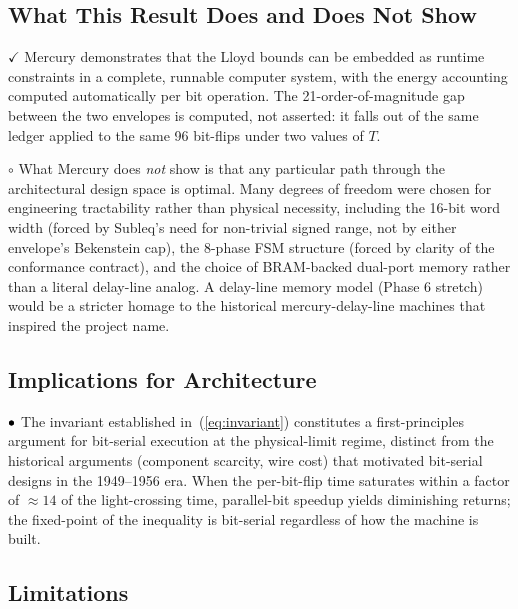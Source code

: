 \documentclass[conference,letterpaper,10pt]{IEEEtran}
\newcommand{\Verified}{\textbf{\textcolor[rgb]{0.0,0.5,0.0}{$\checkmark$}}}
\newcommand{\Plausible}{\textbf{\textcolor[rgb]{0.6,0.4,0.0}{$\bullet\hspace{-0.5em}\circ$}}}
\newcommand{\Speculative}{\textbf{\textcolor[rgb]{0.7,0.0,0.0}{$\circ$}}}
\begin{document}
\subsection{What This Result Does and Does Not Show}

\Verified{} Mercury demonstrates that the Lloyd bounds can be
embedded as runtime constraints in a complete, runnable computer
system, with the energy accounting computed automatically per
bit operation. The 21-order-of-magnitude gap between the two
envelopes is computed, not asserted: it falls out of the same
ledger applied to the same 96 bit-flips under two values of $T$.

\Speculative{} What Mercury does \emph{not} show is that any
particular path through the architectural design space is
optimal. Many degrees of freedom were chosen for engineering
tractability rather than physical necessity, including the 16-bit
word width (forced by Subleq's need for non-trivial signed range,
not by either envelope's Bekenstein cap), the 8-phase FSM
structure (forced by clarity of the conformance contract), and
the choice of BRAM-backed dual-port memory rather than a literal
delay-line analog. A delay-line memory model (Phase 6 stretch)
would be a stricter homage to the historical mercury-delay-line
machines that inspired the project name.

\subsection{Implications for Architecture}

\Plausible{} The invariant established in~(\ref{eq:invariant})
constitutes a first-principles argument for bit-serial execution
at the physical-limit regime, distinct from the historical
arguments (component scarcity, wire cost) that motivated bit-serial
designs in the 1949--1956 era. When the per-bit-flip time
saturates within a factor of $\approx 14$ of the light-crossing
time, parallel-bit speedup yields diminishing returns; the
fixed-point of the inequality is bit-serial regardless of how
the machine is built.

\subsection{Limitations}
\end{document}
